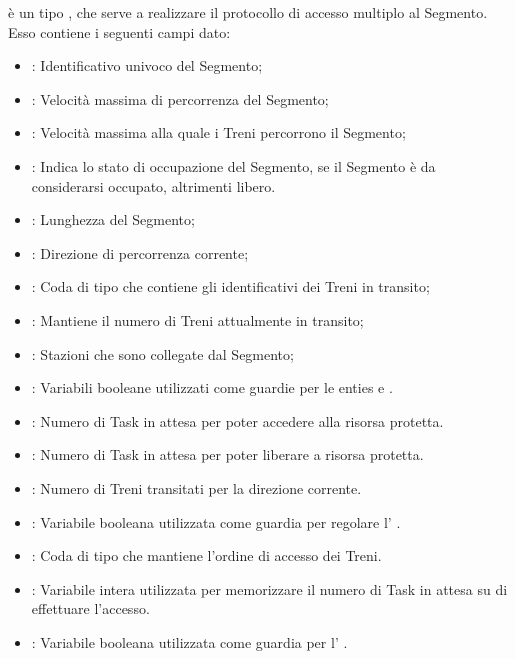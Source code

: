 	 è un tipo , che serve a realizzare il protocollo di accesso multiplo al Segmento. Esso contiene i seguenti campi dato:
	\begin{itemize}
		
		\item {}: Identificativo univoco del Segmento;
		\item {}: Velocità massima di percorrenza del Segmento;
		\item {}: Velocità massima alla quale i Treni percorrono il Segmento;
		\item {}: Indica lo stato di occupazione del Segmento, se  il Segmento è da considerarsi occupato, altrimenti libero.
		\item {}: Lunghezza del Segmento;
		
		\item {}: Direzione di percorrenza corrente;
		
		\item {}: Coda di tipo  che contiene gli identificativi dei Treni in transito;
		\item {}: Mantiene il numero di Treni attualmente in transito;
		
		
		\item {}: Stazioni che sono collegate dal Segmento; 
		
		\item {}: Variabili booleane utilizzati come guardie per le enties  e .
		
		\item {}: Numero di Task in attesa per poter accedere alla risorsa protetta.
		
		\item {}:  Numero di Task in attesa per poter liberare a risorsa protetta. 
		
		\item {}: Numero di Treni transitati per la direzione corrente.
		
		
		\item {}: Variabile booleana utilizzata come guardia per regolare l' .

		
		\item {}: Coda di tipo  che mantiene l'ordine di accesso dei Treni.

		\item {}: Variabile intera utilizzata per memorizzare il numero di Task in attesa su di effettuare l'accesso.

		\item {}: Variabile booleana utilizzata come guardia per l' .
		
	\end{itemize}
	
